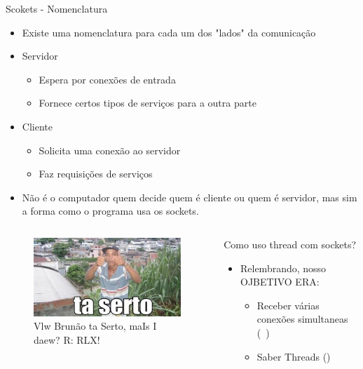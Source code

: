 \documentclass[10pt, xcolor=x11names]{beamer}
\begin{document}
\begin{frame}
	\begin{block}{Scokets - Nomenclatura}
		\begin{itemize}
			\item<1-> Existe uma nomenclatura para cada um dos "lados" da comunicação
			\item<2-> Servidor
				\begin{itemize}
					\item Espera por conexões de entrada
					\item Fornece certos tipos de serviços para a outra parte
				\end{itemize}
			\item<3-> Cliente
				\begin{itemize}
					\item Solicita uma conexão ao servidor
					\item Faz requisições de serviços
				\end{itemize}
			
			\item<4-> Não é o computador quem decide quem é cliente ou quem é servidor, mas sim a forma como o programa usa os sockets.
		\end{itemize}
	\end{block}
\end{frame}
\begin{frame}
	\begin{columns}
			\begin{figure}
				\includegraphics[width=.8\linewidth]{img/taserto.png}
				\caption{Vlw Brunão ta Serto, maIs I daew? R: RLX!}
			\end{figure}
		

		\begin{block}{Como uso thread com sockets?}
			\begin{itemize}
				\item Relembrando, nosso OJBETIVO ERA:
					\begin{itemize}
						\item Receber várias conexões simultaneas (~)
						\item Saber Threads (\checkmark)
					\end{itemize}
			\end{itemize}
		\end{block}
		
	\end{columns}
\end{frame}
\end{document}
